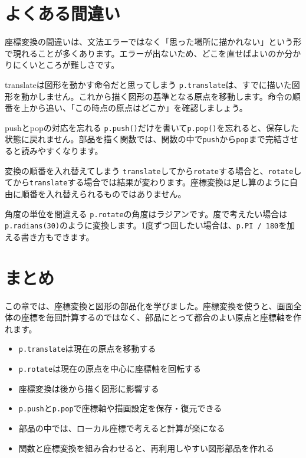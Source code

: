 \section{よくある間違い}

座標変換の間違いは、文法エラーではなく「思った場所に描かれない」という形で現れることが多くあります。エラーが出ないため、どこを直せばよいのか分かりにくいところが難しさです。

\begin{mistakebox}{translateは図形を動かす命令だと思ってしまう}
\texttt{p.translate}は、すでに描いた図形を動かしません。これから描く図形の基準となる原点を移動します。命令の順番を上から追い、「この時点の原点はどこか」を確認しましょう。
\end{mistakebox}

\begin{mistakebox}{pushとpopの対応を忘れる}
\texttt{p.push()}だけを書いて\texttt{p.pop()}を忘れると、保存した状態に戻れません。部品を描く関数では、関数の中で\texttt{push}から\texttt{pop}まで完結させると読みやすくなります。
\end{mistakebox}

\begin{mistakebox}{変換の順番を入れ替えてしまう}
\texttt{translate}してから\texttt{rotate}する場合と、\texttt{rotate}してから\texttt{translate}する場合では結果が変わります。座標変換は足し算のように自由に順番を入れ替えられるものではありません。
\end{mistakebox}

\begin{mistakebox}{角度の単位を間違える}
\texttt{p.rotate}の角度はラジアンです。度で考えたい場合は\texttt{p.radians(30)}のように変換します。1度ずつ回したい場合は、\texttt{p.PI / 180}を加える書き方もできます。
\end{mistakebox}

\section{まとめ}

この章では、座標変換と図形の部品化を学びました。座標変換を使うと、画面全体の座標を毎回計算するのではなく、部品にとって都合のよい原点と座標軸を作れます。

\begin{itemize}
    \item \texttt{p.translate}は現在の原点を移動する
    \item \texttt{p.rotate}は現在の原点を中心に座標軸を回転する
    \item 座標変換は後から描く図形に影響する
    \item \texttt{p.push}と\texttt{p.pop}で座標軸や描画設定を保存・復元できる
    \item 部品の中では、ローカル座標で考えると計算が楽になる
    \item 関数と座標変換を組み合わせると、再利用しやすい図形部品を作れる
\end{itemize}

